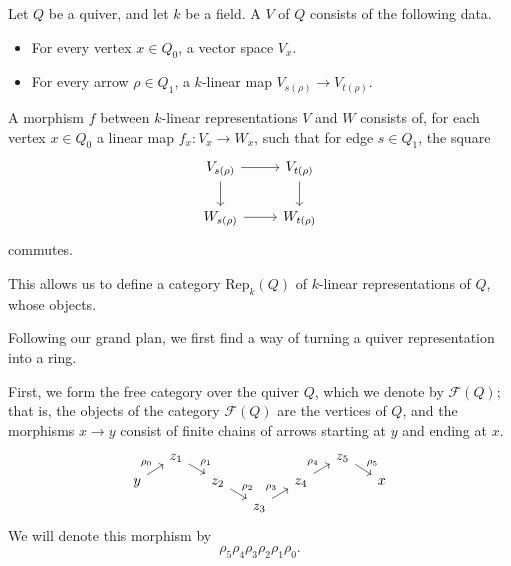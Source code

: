 \documentclass[main.tex]{subfiles}
\begin{document}
\begin{definition}
  \label{def:quiver_representation}
  Let $Q$ be a quiver, and let $k$ be a field. A  $V$ of $Q$ consists of the following data.
  \begin{itemize}
    \item For every vertex $x \in Q_{0}$, a vector space $V_{x}$.

    \item For every arrow $\rho \in Q_{1}$, a $k$-linear map $V_{s(\rho)} \to V_{t(\rho)}$.
  \end{itemize}
  A morphism $f$ between $k$-linear representations $V$ and $W$ consists of, for each vertex $x \in Q_{0}$ a linear map $f_{x}\colon V_{x} \to W_{x}$, such that for edge $s \in Q_{1}$, the square
  \begin{equation*}
    \begin{tikzcd}
      V_{s(\rho)}
      \arrow[r]
      \arrow[d]
      & V_{t(\rho)}
      \arrow[d]
      \\
      W_{s(\rho)}
      \arrow[r]
      & W_{t(\rho)}
    \end{tikzcd}
  \end{equation*}
  commutes.
\end{definition}

This allows us to define a category $\mathrm{Rep}_{k}(Q)$ of $k$-linear representations of $Q$, whose objects.

Following our grand plan, we first find a way of turning a quiver representation into a ring.

First, we form the free category over the quiver $Q$, which we denote by $\mathcal{F}(Q)$; that is, the objects of the category $\mathcal{F}(Q)$ are the vertices of $Q$, and the morphisms $x \to y$ consist of finite chains of arrows starting at $y$ and ending at $x$.
\begin{equation*}
  \begin{tikzcd}[row sep=tiny, column sep=small]
    & z_{1}
    \arrow[dr, "\rho_{1}"]
    &&&& z_{5}
    \arrow[dr, "\rho_{5}"]
    \\
    y
    \arrow[ur, "\rho_{0}"]
    && z_{2}
    \arrow[dr, "\rho_{2}"]
    && z_{4}
    \arrow[ur, "\rho_{4}"]
    && x
    \\
    &&& z_{3}
    \arrow[ur, "\rho_{3}"]
  \end{tikzcd}
\end{equation*}
We will denote this morphism by
\begin{equation*}
  \rho_{5}\rho_{4}\rho_{3}\rho_{2}\rho_{1}\rho_{0}.
\end{equation*}
\end{document}
